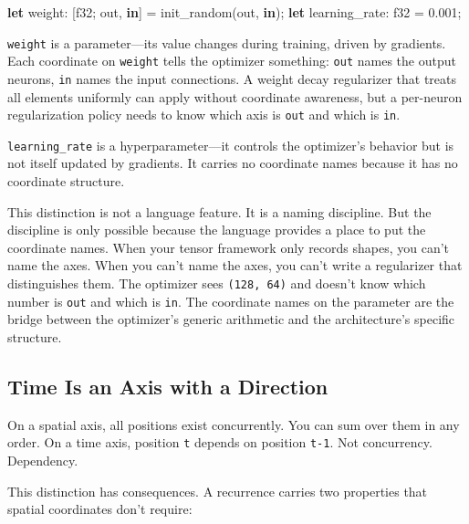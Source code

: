 \documentclass[11pt,titlepage]{article}
\newenvironment{Shaded}{}{}
\newcommand{\DataTypeTok}[1]{\textcolor[rgb]{0.56,0.13,0.00}{#1}}
\newcommand{\DecValTok}[1]{\textcolor[rgb]{0.25,0.63,0.44}{#1}}
\newcommand{\KeywordTok}[1]{\textcolor[rgb]{0.00,0.44,0.13}{\textbf{#1}}}
\newcommand{\NormalTok}[1]{#1}
\newcommand{\OperatorTok}[1]{\textcolor[rgb]{0.40,0.40,0.40}{#1}}
\begin{document}
\begin{Shaded}
\begin{Highlighting}[]
\KeywordTok{let}\NormalTok{ weight: }\OperatorTok{[}\DataTypeTok{f32}\NormalTok{; out, }\KeywordTok{in}\OperatorTok{]}\NormalTok{ = init_random(out, }\KeywordTok{in}\NormalTok{);}
\KeywordTok{let}\NormalTok{ learning_rate: }\DataTypeTok{f32}\NormalTok{ = }\DecValTok{0.001}\NormalTok{;}
\end{Highlighting}
\end{Shaded}

\texttt{weight} is a parameter---its value changes during training,
driven by gradients. Each coordinate on \texttt{weight} tells the
optimizer something: \texttt{out} names the output neurons, \texttt{in}
names the input connections. A weight decay regularizer that treats all
elements uniformly can apply without coordinate awareness, but a
per-neuron regularization policy needs to know which axis is
\texttt{out} and which is \texttt{in}.

\texttt{learning\_rate} is a hyperparameter---it controls the
optimizer's behavior but is not itself updated by gradients. It carries
no coordinate names because it has no coordinate structure.

This distinction is not a language feature. It is a naming discipline.
But the discipline is only possible because the language provides a
place to put the coordinate names. When your tensor framework only
records shapes, you can't name the axes. When you can't name the axes,
you can't write a regularizer that distinguishes them. The optimizer
sees \texttt{(128,\ 64)} and doesn't know which number is \texttt{out}
and which is \texttt{in}. The coordinate names on the parameter are the
bridge between the optimizer's generic arithmetic and the architecture's
specific structure.

\vspace{2em}

\hypertarget{time-is-an-axis-with-a-direction}{%
\subsection{Time Is an Axis with a
Direction}\label{time-is-an-axis-with-a-direction}}

On a spatial axis, all positions exist concurrently. You can sum over
them in any order. On a time axis, position \texttt{t} depends on
position \texttt{t-1}. Not concurrency. Dependency.

This distinction has consequences. A recurrence carries two properties
that spatial coordinates don't require:
\end{document}
